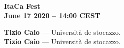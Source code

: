 \documentclass{article}
\makeatletter
\def\fsize#1#2{\fontsize{#1}{#1}\selectfont #2}
\newcommand{\talk}[3]{
  {\textbf{#1}} --- #2. \textit{#3}
} %
\makeatother
\begin{document}
\begin{flushright}
  \hrulefill\\[2mm]
  \noindent\fsize{40}{\textbf{ItaCa Fest}}\\[5mm]
  \fsize{25}{\textbf{June 17 2020 -- 14:00 CEST}}\\[5mm]
\end{flushright}

\large
\talk{Tizio Caio}{Università de stocazzo}{\lipsum[2]}\\[2em]

\talk{Tizio Caio}{Università de stocazzo}{\lipsum[2]}
\end{document}
